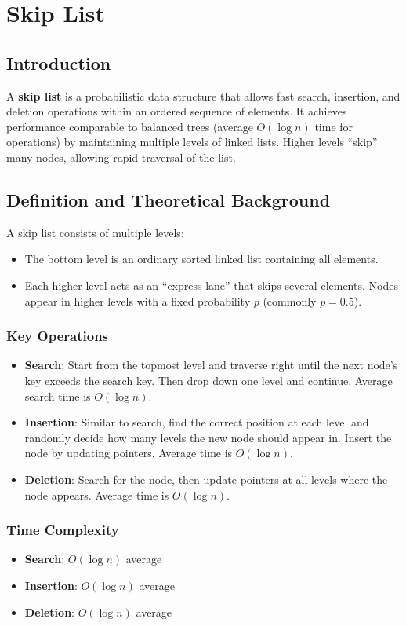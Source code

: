 \chapter{Skip List}

\section{Introduction}
A \textbf{skip list} is a probabilistic data structure that allows fast search, insertion, and deletion operations within an ordered sequence of elements. It achieves performance comparable to balanced trees (average \( O(\log n) \) time for operations) by maintaining multiple levels of linked lists. Higher levels “skip” many nodes, allowing rapid traversal of the list.

\section{Definition and Theoretical Background}
A skip list consists of multiple levels:
\begin{itemize}
    \item The bottom level is an ordinary sorted linked list containing all elements.
    \item Each higher level acts as an “express lane” that skips several elements. Nodes appear in higher levels with a fixed probability \( p \) (commonly \( p=0.5 \)).
\end{itemize}

\subsection{Key Operations}
\begin{itemize}
    \item \textbf{Search}: Start from the topmost level and traverse right until the next node's key exceeds the search key. Then drop down one level and continue. Average search time is \( O(\log n) \).
    \item \textbf{Insertion}: Similar to search, find the correct position at each level and randomly decide how many levels the new node should appear in. Insert the node by updating pointers. Average time is \( O(\log n) \).
    \item \textbf{Deletion}: Search for the node, then update pointers at all levels where the node appears. Average time is \( O(\log n) \).
\end{itemize}

\subsection{Time Complexity}
\begin{itemize}
    \item \textbf{Search}: \( O(\log n) \) average
    \item \textbf{Insertion}: \( O(\log n) \) average
    \item \textbf{Deletion}: \( O(\log n) \) average
\end{itemize}


